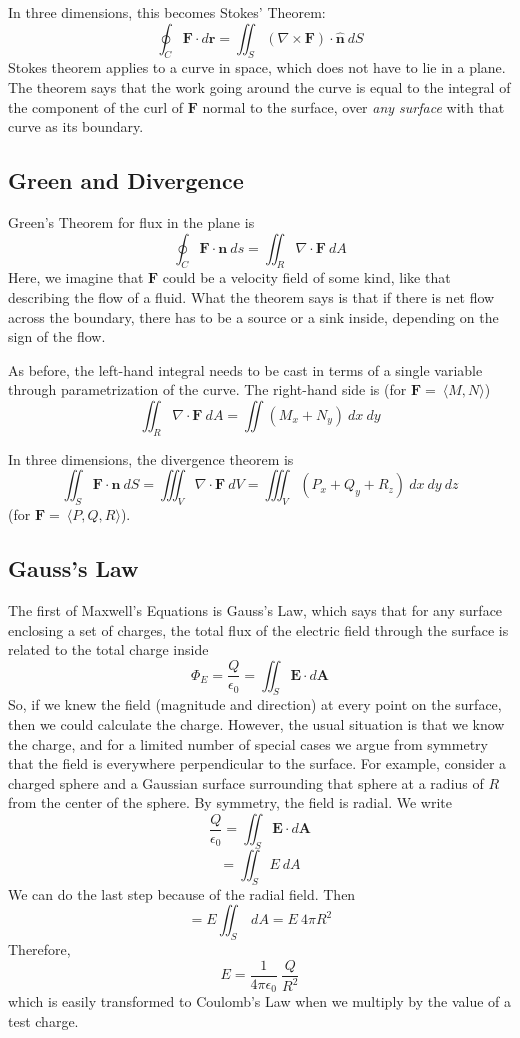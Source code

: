 \documentclass[11pt, oneside]{article}   	%
\begin{document}
In three dimensions, this becomes Stokes' Theorem:
\[ \oint_C \mathbf{F} \cdot d \mathbf{r} = \iint_S ( \nabla \times \mathbf{F}) \cdot \hat{\mathbf{n}} \ dS \]
Stokes theorem applies to a curve in space, which does not have to lie in a plane.  The theorem says that the work going around the curve is equal to the integral of the component of the curl of $\mathbf{F}$ normal to the surface, over \emph{any surface} with that curve as its boundary. 

\subsection*{Green and Divergence}
Green's Theorem for flux in the plane is
\[ \oint_C \mathbf{F} \cdot \mathbf{n} \ ds = \iint_R \nabla \cdot \mathbf{F} \ dA \]
Here, we imagine that $\mathbf{F}$ could be a velocity field of some kind, like that describing the flow of a fluid.  What the theorem says is that if there is net flow across the boundary, there has to be a source or a sink inside, depending on the sign of the flow.

As before, the left-hand integral needs to be cast in terms of a single variable through parametrization of the curve.  The right-hand side is (for $\mathbf{F} = \ \langle M, N \rangle$)
\[ \iint_R \nabla \cdot \mathbf{F} \ dA = \iint (M_x + N_y) \ dx \ dy   \]

In three dimensions, the divergence theorem is
\[ \iint_S \mathbf{F} \cdot \mathbf{n} \ dS = \iiint_V \nabla \cdot \mathbf{F} \ dV = \iiint_V (P_x + Q_y + R_z) \ dx \ dy \ dz \]
(for $\mathbf{F} = \ \langle P,Q,R \rangle$).

\subsection*{Gauss's Law}
The first of Maxwell's Equations is Gauss's Law, which says that for any surface enclosing a set of charges, the total flux of the electric field through the surface is related to the total charge inside
\[ \Phi_E = \frac{Q}{\epsilon_0} = \iint_S \mathbf{E} \cdot d\mathbf{A} \]
So, if we knew the field (magnitude and direction) at every point on the surface, then we could calculate the charge.  However, the usual situation is that we know the charge, and for a limited number of special cases we argue from symmetry that the field is everywhere perpendicular to the surface.  For example, consider a charged sphere and a Gaussian surface surrounding that sphere at a radius of $R$ from the center of the sphere.  By symmetry, the field is radial.  We write
\[ \frac{Q}{\epsilon_0} = \iint_S \mathbf{E} \cdot d\mathbf{A} \]
\[ = \iint_S E \ dA \]
We can do the last step because of the radial field.  Then
\[ = E \iint_S \ dA = E \ 4 \pi R^2 \]
Therefore,
\[ E = \frac{1}{4 \pi \epsilon_0} \ \frac{Q}{R^2} \]
which is easily transformed to Coulomb's Law when we multiply by the value of a test charge.
\end{document}
